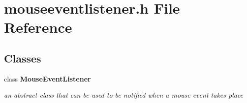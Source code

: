 \section{mouseeventlistener.\+h File Reference}
\label{bk3_2mouseeventlistener_8h}
\subsection*{Classes}
\begin{DoxyCompactItemize}
\item 
class {\bf Mouse\+Event\+Listener}
\begin{DoxyCompactList}\small\item\em an abstract class that can be used to be notified when a mouse event takes place \end{DoxyCompactList}\end{DoxyCompactItemize}
